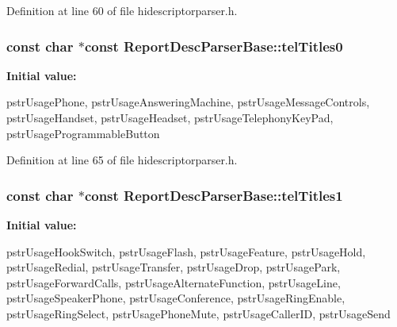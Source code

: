 \-Definition at line 60 of file hidescriptorparser.\-h.

\hypertarget{class_report_desc_parser_base_ae86d70945d59c48153463bca302bd356}{
\subsubsection[{tel\-Titles0}]{\setlength{\rightskip}{0pt plus 5cm}const char $\ast$const {\bf \-Report\-Desc\-Parser\-Base\-::tel\-Titles0}}}\label{class_report_desc_parser_base_ae86d70945d59c48153463bca302bd356}
{\bfseries \-Initial value\-:}
\begin{DoxyCode}
 {
        pstrUsagePhone,
        pstrUsageAnsweringMachine,
        pstrUsageMessageControls,
        pstrUsageHandset,
        pstrUsageHeadset,
        pstrUsageTelephonyKeyPad,
        pstrUsageProgrammableButton
}
\end{DoxyCode}


\-Definition at line 65 of file hidescriptorparser.\-h.

\hypertarget{class_report_desc_parser_base_a9e83e4d47816c0330ccae5bd31e10031}{
\subsubsection[{tel\-Titles1}]{\setlength{\rightskip}{0pt plus 5cm}const char $\ast$const {\bf \-Report\-Desc\-Parser\-Base\-::tel\-Titles1}}}\label{class_report_desc_parser_base_a9e83e4d47816c0330ccae5bd31e10031}
{\bfseries \-Initial value\-:}
\begin{DoxyCode}
 {
        pstrUsageHookSwitch,
        pstrUsageFlash,
        pstrUsageFeature,
        pstrUsageHold,
        pstrUsageRedial,
        pstrUsageTransfer,
        pstrUsageDrop,
        pstrUsagePark,
        pstrUsageForwardCalls,
        pstrUsageAlternateFunction,
        pstrUsageLine,
        pstrUsageSpeakerPhone,
        pstrUsageConference,
        pstrUsageRingEnable,
        pstrUsageRingSelect,
        pstrUsagePhoneMute,
        pstrUsageCallerID,
        pstrUsageSend
}
\end{DoxyCode}


